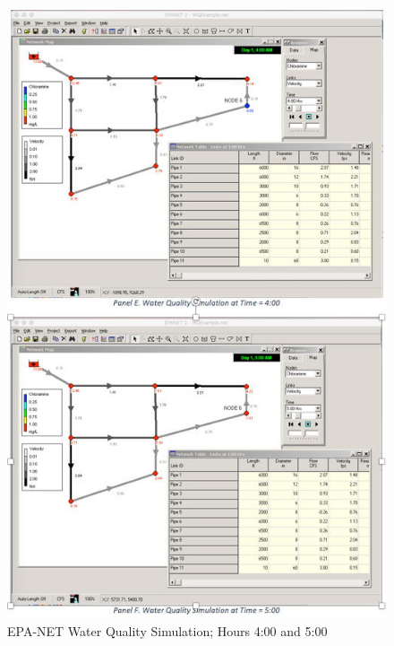 \documentclass[11pt]{article}
\begin{document}
\begin{enumerate}
\begin{figure}[ht!] %
\centering
   \includegraphics[width=4.5in]{WaterQuality-3.jpg}
     \caption{EPA-NET Water Quality Simulation; Hours 4:00 and 5:00}
   \label{fig:waterQ3} 
\end{figure}
\clearpage

\end{enumerate}



\end{document}
